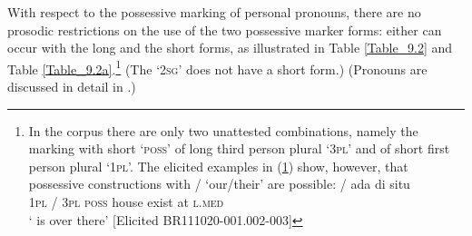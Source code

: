 \begin{xlist}
\smallskip
{}

\smallskip
{}

\smallskip
{}
\end{xlist}
\z

With respect to the possessive marking of personal pronouns, there are no prosodic restrictions on the use of the two possessive marker forms: either can occur with the long and the short  forms, as illustrated in Table  \ref{Table_9.2} and Table \ref{Table_9.2a}.\footnote{In the corpus there are only two unattested combinations, namely the marking with short  ‘\textsc{poss}’ of long third person plural  ‘\textsc{3pl}’ and of short first person plural  ‘\textsc{1pl}’. The elicited examples in (\ref{Footnote_Example_9.1}) show, however, that possessive constructions with /  ‘our/their’ are possible:
\vspace{-5pt}
\ea
\label{Footnote_Example_9.1}
\gll {} /    ada di situ\\
\textsc{1pl} / \textsc{3pl} \textsc{poss} house exist at \textsc{l.med}\\
\glt ‘ is over there’ [Elicited BR111020-001.002-003]
\z
} (The   \textsc{‘2sg’} does not have a short form.) (Pronouns are discussed in detail in .)


